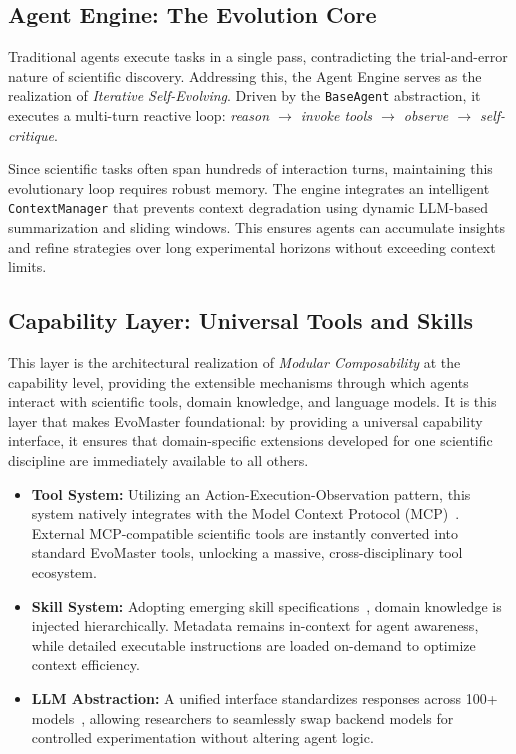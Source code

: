 \documentclass[11pt, a4paper, logo, copyright, nonumbering]{cls/Sci}
\begin{document}
\subsection{Agent Engine: The Evolution Core}

Traditional agents execute tasks in a single pass, contradicting the trial-and-error nature of scientific discovery. Addressing this, the Agent Engine serves as the realization of \emph{Iterative Self-Evolving}. Driven by the \texttt{BaseAgent} abstraction, it executes a multi-turn reactive loop: \textit{reason $\rightarrow$ invoke tools $\rightarrow$ observe $\rightarrow$ self-critique}. 

Since scientific tasks often span hundreds of interaction turns, maintaining this evolutionary loop requires robust memory. The engine integrates an intelligent \texttt{ContextManager} that prevents context degradation using dynamic LLM-based summarization and sliding windows. This ensures agents can accumulate insights and refine strategies over long experimental horizons without exceeding context limits.

\subsection{Capability Layer: Universal Tools and Skills}

This layer is the architectural realization of \emph{Modular Composability} at the capability level, providing the extensible mechanisms through which agents interact with scientific tools, domain knowledge, and language models. It is this layer that makes EvoMaster foundational: by providing a universal capability interface, it ensures that domain-specific extensions developed for one scientific discipline are immediately available to all others.

\begin{itemize}[leftmargin=*, nosep]
    \item \textbf{Tool System:} Utilizing an Action-Execution-Observation pattern, this system natively integrates with the Model Context Protocol (MCP)~\citep{mcp2025}. External MCP-compatible scientific tools are instantly converted into standard EvoMaster tools, unlocking a massive, cross-disciplinary tool ecosystem.
    \item \textbf{Skill System:} Adopting emerging skill specifications~\citep{anthropic2025skills}, domain knowledge is injected hierarchically. Metadata remains in-context for agent awareness, while detailed executable instructions are loaded on-demand to optimize context efficiency.
    \item \textbf{LLM Abstraction:} A unified interface standardizes responses across 100+ models~\citep{litellm2024}, allowing researchers to seamlessly swap backend models for controlled experimentation without altering agent logic.
\end{itemize}
\end{document}
